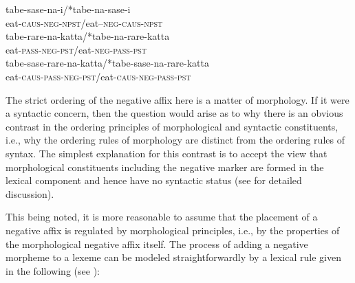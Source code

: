 \documentclass[output=paper
                ,modfonts
                ,nonflat
	        ,collection
	        ,collectionchapter
	        ,collectiontoclongg
 	        ,biblatex
                ,babelshorthands
                ,newtxmath
                ,draftmode
                ,colorlinks, citecolor=brown
]{./langsci/langscibook}
\begin{document}
{\begin{exe}
\begin{xlist}
\begin{exe}
\begin{xlist}
\eal
\ex
\gll tabe-sase-na-i/*tabe-na-sase-i \\
     eat-\textsc{caus}-\textsc{neg}-\textsc{npst}/eat--\textsc{neg}-\textsc{caus}-\textsc{npst} \\

\ex
\gll tabe-rare-na-katta/*tabe-na-rare-katta \\
     eat-\textsc{pass}-\textsc{neg}-\textsc{pst}/eat-\textsc{neg}-\textsc{pass}-\textsc{pst} \\

\ex
\gll tabe-sase-rare-na-katta/*tabe-sase-na-rare-katta \\
     eat-\textsc{caus}-\textsc{pass}-\textsc{neg}-\textsc{pst}/eat-\textsc{caus}-\textsc{neg}-\textsc{pass}-\textsc{pst}\\
\zl

\noindent
The strict ordering of the negative affix here is a matter of morphology.
If it were a syntactic concern, then
the question would arise as to why
there is an obvious contrast in the ordering principles
of morphological and syntactic constituents, i.e., why the ordering
rules of morphology are distinct from the ordering rules of syntax. The
simplest explanation for this contrast is to accept
the view that morphological constituents including the negative marker
are formed in the lexical component and hence have no syntactic
status (see \citealt[Chapter~2]{Kim:00} for detailed discussion).

This being noted, it is more reasonable to assume that the placement of a
negative affix is regulated by morphological principles, i.e., by
the properties of the morphological negative affix itself.
%
%
The process of adding a negative morpheme to a lexeme can be modeled
straightforwardly by a lexical rule given in the following (see \citealt{Kim:00,Crowgey:12}):


\end{xlist}
\end{exe}
\end{xlist}
\end{exe}}
\end{document}

